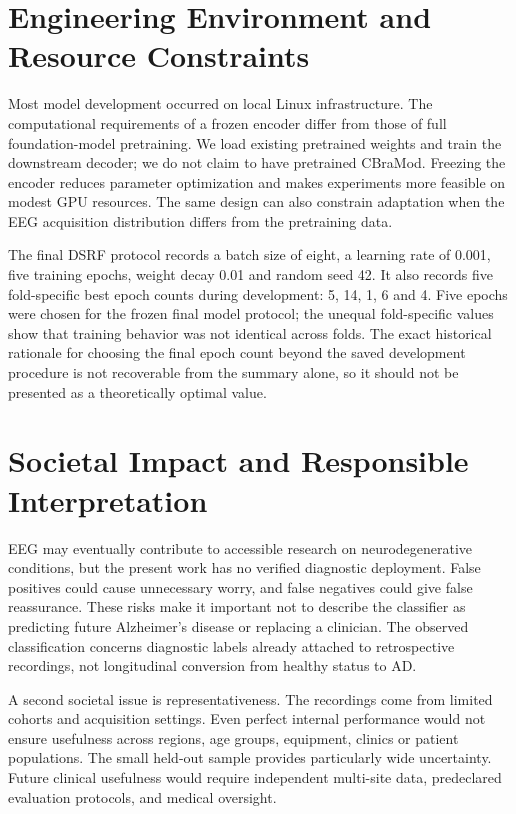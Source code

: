 \section{Engineering Environment and Resource Constraints}
Most model development occurred on local Linux infrastructure. The computational requirements of a frozen encoder differ from those of full foundation-model pretraining. We load existing pretrained weights and train the downstream decoder; we do not claim to have pretrained CBraMod. Freezing the encoder reduces parameter optimization and makes experiments more feasible on modest GPU resources. The same design can also constrain adaptation when the EEG acquisition distribution differs from the pretraining data.

The final DSRF protocol records a batch size of eight, a learning rate of 0.001, five training epochs, weight decay 0.01 and random seed 42. It also records five fold-specific best epoch counts during development: 5, 14, 1, 6 and 4. Five epochs were chosen for the frozen final model protocol; the unequal fold-specific values show that training behavior was not identical across folds. The exact historical rationale for choosing the final epoch count beyond the saved development procedure is not recoverable from the summary alone, so it should not be presented as a theoretically optimal value.

\section{Societal Impact and Responsible Interpretation}
EEG may eventually contribute to accessible research on neurodegenerative conditions, but the present work has no verified diagnostic deployment. False positives could cause unnecessary worry, and false negatives could give false reassurance. These risks make it important not to describe the classifier as predicting future Alzheimer's disease or replacing a clinician. The observed classification concerns diagnostic labels already attached to retrospective recordings, not longitudinal conversion from healthy status to AD.

A second societal issue is representativeness. The recordings come from limited cohorts and acquisition settings. Even perfect internal performance would not ensure usefulness across regions, age groups, equipment, clinics or patient populations. The small held-out sample provides particularly wide uncertainty. Future clinical usefulness would require independent multi-site data, predeclared evaluation protocols, and medical oversight.

